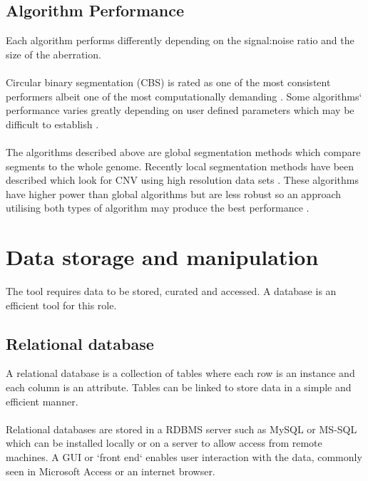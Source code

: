 \subsection{Algorithm Performance}
Each algorithm performs differently depending on the signal:noise ratio and the size of the aberration\cite{willenbrock2005}.
\paragraph*{}
Circular binary segmentation (CBS) is rated as one of the most consistent performers albeit one of the most computationally demanding \cite{lai2005,willenbrock2005}. Some algorithms` performance varies greatly depending on user defined parameters which may be difficult to establish \cite{lai2005}.
\paragraph*{}
The algorithms described above are global segmentation methods which compare segments to the whole genome. Recently local segmentation methods have been described which look for CNV using high resolution data sets \cite{niu_screening_2012}. These algorithms have higher power than global algorithms but are less robust so an approach utilising both types of algorithm may produce the best performance \cite{roy2013}.

\section{Data storage and manipulation}
The tool requires data to be stored, curated and accessed. A database is an efficient tool for this role. 

\subsection{Relational database}
A relational database is a collection of tables where each row is an instance and each column is an attribute. Tables can be linked to store data in a simple and efficient manner.
\paragraph*{}
Relational databases are stored in a \ac{RDBMS} server such as MySQL or MS-SQL which can be installed locally or on a server to allow access from remote machines. A \ac{GUI} or `front end` enables user interaction with the data, commonly seen in Microsoft Access or an internet browser. 
